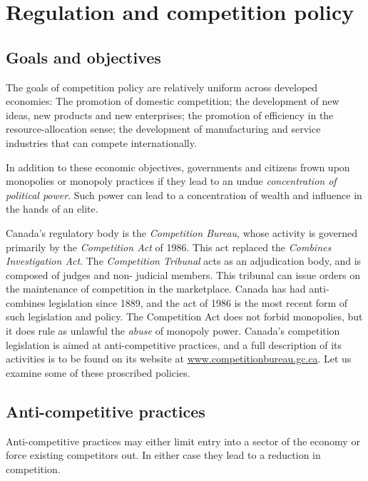 \section{Regulation and competition policy}\label{sec:ch14sec5}

\subsection*{Goals and objectives}

The goals of competition policy are relatively uniform across developed
economies: The promotion of domestic competition; the development of new
ideas, new products and new enterprises; the promotion of efficiency in the
resource-allocation sense; the development of manufacturing and service
industries that can compete internationally.

In addition to these economic objectives, governments and citizens frown
upon monopolies or monopoly practices if they lead to an undue \textit{%
	concentration of political power}. Such power can lead to a concentration of
wealth and influence in the hands of an elite.

Canada's regulatory body is the \textit{Competition Bureau}, whose activity
is governed primarily by the \textit{Competition Act} of 1986. This act
replaced the \textit{Combines Investigation Act}. The \textit{Competition
	Tribunal} acts as an adjudication body, and is composed of judges and non-
judicial members. This tribunal can issue orders on the maintenance of
competition in the marketplace. Canada has had anti-combines legislation
since 1889, and the act of 1986 is the most recent form of such legislation
and policy. The Competition Act does not forbid monopolies, but it does rule
as unlawful the \textit{abuse} of monopoly power. Canada's competition
legislation is aimed at anti-competitive practices, and a full description
of its activities is to be found on its website at \href{www.competitionbureau.gc.ca}{www.competitionbureau.gc.ca}.
Let us examine some of these proscribed
policies.

\newhtmlpage

\subsection*{Anti-competitive practices}

Anti-competitive practices may either limit entry into a sector of the
economy or force existing competitors out. In either case they lead to a
reduction in competition.

